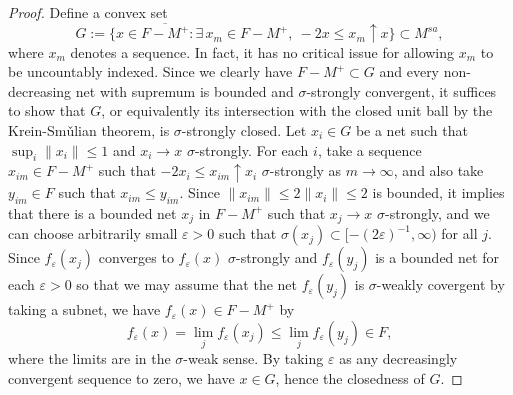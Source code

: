 \documentclass[a4paper]{amsart}
\newcommand{\e}{\varepsilon}
\theoremstyle{plain}
\theoremstyle{definition}
\begin{document}
\begin{proof}
Define a convex set
\[G:=\{x\in\overline{F-M^+}:\exists\,x_m\in F-M^+,\ -2x\le x_m\uparrow x\}\subset M^{sa},\]
where $x_m$ denotes a sequence.
In fact, it has no critical issue for allowing $x_m$ to be uncountably indexed.
Since we clearly have $F-M^+\subset G$ and every non-decreasing net with supremum is bounded and $\sigma$-strongly convergent, it suffices to show that $G$, or equivalently its intersection with the closed unit ball by the Krein-Sm\v ulian theorem, is $\sigma$-strongly closed.
Let $x_i\in G$ be a net such that $\sup_i\|x_i\|\le1$ and $x_i\to x$ $\sigma$-strongly.
For each $i$, take a sequence $x_{im}\in F-M^+$ such that $-2x_i\le x_{im}\uparrow x_i$ $\sigma$-strongly as $m\to\infty$, and also take $y_{im}\in F$ such that $x_{im}\le y_{im}$.
Since $\|x_{im}\|\le2\|x_i\|\le2$ is bounded, it implies that there is a bounded net $x_j$ in $F-M^+$ such that $x_j\to x$ $\sigma$-strongly, and we can choose arbitrarily small $\e>0$ such that $\sigma(x_j)\subset[-(2\e)^{-1},\infty)$ for all $j$.
Since $f_\e(x_j)$ converges to $f_\e(x)$ $\sigma$-strongly and $f_\e(y_j)$ is a bounded net for each $\e>0$ so that we may assume that the net $f_\e(y_j)$ is $\sigma$-weakly covergent by taking a subnet, we have $f_\e(x)\in F-M^+$ by
\[f_\e(x)=\lim_jf_\e(x_j)\le\lim_jf_\e(y_j)\in F,\]
where the limits are in the $\sigma$-weak sense.
By taking $\e$ as any decreasingly convergent sequence to zero, we have $x\in G$, hence the closedness of $G$.



\end{proof}
\end{document}
